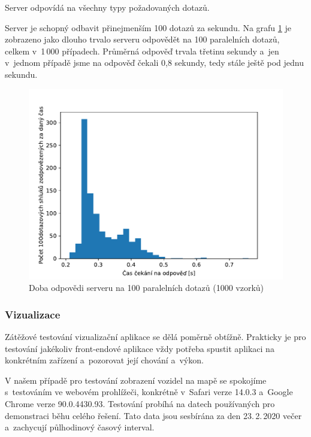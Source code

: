 Server odpovídá na všechny typy požadovaných dotazů.

\bigbreak

Server je schopný odbavit přinejmenším 100 dotazů za sekundu. Na grafu \ref{fig:server_response_time} je zobrazeno jako dlouho trvalo serveru odpovědět na 100 paralelních dotazů, celkem v~1\,000 případech. Průměrná odpověď trvala třetinu sekundy a~jen v~jednom případě jsme na odpověď čekali 0,8 sekundy, tedy stále ještě pod jednu sekundu.

\begin{figure}
   \centering
 \includegraphics[width=\linewidth]{../img/server_response_time}
 \caption{Doba odpovědi serveru na 100 paralelních dotazů (1000 vzorků)}
 \label{fig:server_response_time}
\end{figure}


\subsubsection{Vizualizace}

Zátěžové testování vizualizační aplikace se dělá poměrně obtížně. Prakticky je pro testování jakékoliv front-endové aplikace vždy potřeba spustit aplikaci na konkrétním zařízení a~pozorovat její chování a~výkon.


\bigbreak

V našem případě pro testování zobrazení vozidel na mapě se spokojíme s~testováním ve webovém prohlížeči, konkrétně v~Safari verze 14.0.3 a~Google Chrome verze 90.0.4430.93. Testování probíhá na datech používaných pro demonstraci běhu celého řešení. Tato data jsou sesbírána za den 23.\,2.\,2020 večer a~zachycují půlhodinový časový interval.


